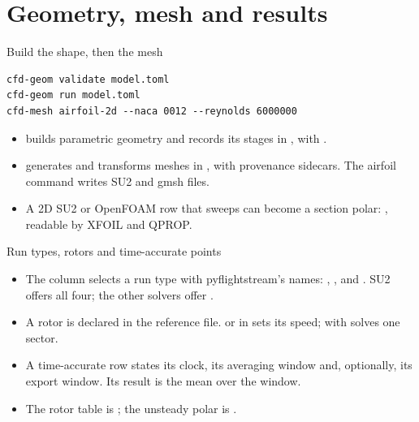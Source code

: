 \section{Geometry, mesh and results}

\begin{frame}[fragile]{Build the shape, then the mesh}
\begin{lstlisting}
cfd-geom validate model.toml
cfd-geom run model.toml
cfd-mesh airfoil-2d --naca 0012 --reynolds 6000000
\end{lstlisting}
\begin{itemize}\small
  \item {} builds parametric geometry and records its stages in
        , with .
  \item {} generates and transforms meshes in ,
        with provenance sidecars. The airfoil command writes SU2 and gmsh files.
  \item A 2D SU2 or OpenFOAM row that sweeps  can become a section
        polar: , readable by XFOIL and QPROP.
\end{itemize}
\end{frame}

\begin{frame}{Run types, rotors and time-accurate points}
\begin{itemize}\small
  \item The  column selects a run type with pyflightstream's
        names: , ,  and
        . SU2 offers all four; the other solvers offer
        .
  \item A rotor is declared in the reference file.  or
         in  sets its speed;
          with  solves one
        sector.
  \item A time-accurate row states its clock, its averaging window and,
        optionally, its export window. Its result is the mean over the window.
  \item The rotor table is ; the
        unsteady polar is .
\end{itemize}
\end{frame}

